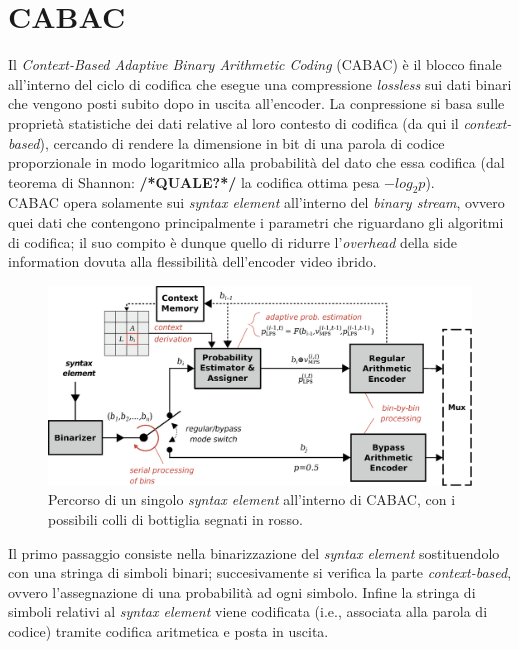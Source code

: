 \section{CABAC}
Il \emph{Context-Based Adaptive Binary Arithmetic Coding} (CABAC) è il blocco 
finale all'interno del ciclo di codifica che esegue una compressione 
\emph{lossless} sui dati binari che vengono posti subito dopo in uscita 
all'encoder. La conpressione si basa sulle proprietà statistiche dei dati 
relative al loro contesto di codifica (da qui il \emph{context-based}), cercando
di rendere la dimensione in bit di una parola di codice proporzionale in modo 
logaritmico alla probabilità del dato che essa codifica (dal teorema di Shannon:
\textbf{/*QUALE?*/} la codifica ottima pesa $-log_2p$). \\
CABAC opera solamente sui \emph{syntax element} all'interno del \emph{binary 
stream}, ovvero quei dati che contengono principalmente i parametri che 
riguardano gli algoritmi di codifica; il suo compito è dunque quello di ridurre
l'\emph{overhead} della side information dovuta alla flessibilità dell'encoder 
video ibrido. \\

\begin{figure}[H]
  \centering
  \captionsetup{justification=raggedright}
  \includegraphics[scale=0.35]{Figures/Cabac_overview}
  \caption[Percorso di un \emph{syntax element} dentro CABAC]
	  {Percorso di un singolo \emph{syntax element} all'interno di CABAC,
	   con i possibili colli di bottiglia segnati in rosso.}
\end{figure}

Il primo passaggio consiste nella binarizzazione del \emph{syntax element} 
sostituendolo con una stringa di simboli binari; succesivamente si verifica 
la parte \emph{context-based}, ovvero l'assegnazione di una probabilità ad ogni 
simbolo. Infine la stringa di simboli relativi al \emph{syntax element} viene 
codificata (i.e., associata alla parola di codice) tramite codifica aritmetica e
posta in uscita.

